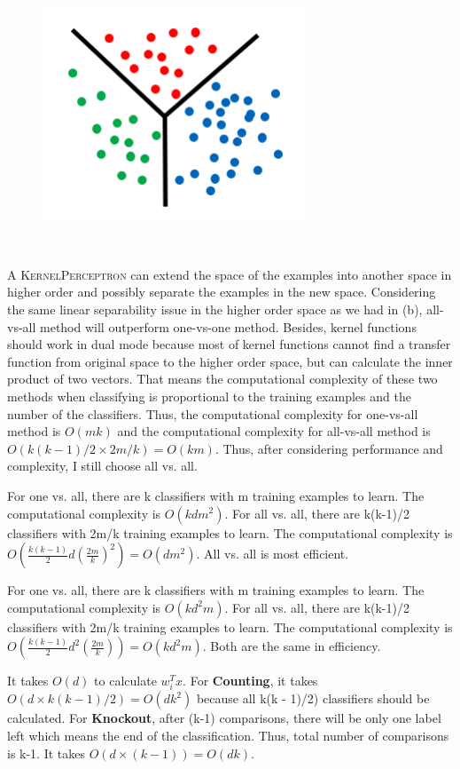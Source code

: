 \begin{figure}[h]
		\centering
	\includegraphics[width=0.7\textwidth]{fig3.png}
\end{figure}\\
\item[(c)]
A \textsc{KernelPerceptron} can extend the space of the examples into another space in higher order and possibly separate the examples in the new space. Considering the same linear separability issue in the higher order space as we had in (b), all-vs-all method will outperform one-vs-one method. Besides, kernel functions should work in dual mode because most of kernel functions cannot find a transfer function from original space to the higher order space, but can calculate the inner product of two vectors. That means the computational complexity of these two methods when classifying is proportional to the training examples and the number of the classifiers. Thus, the computational complexity for one-vs-all method is $O(mk)$ and the computational complexity for all-vs-all method is $O(k(k-1)/2\times 2m/k)=O(km)$. Thus, after considering performance and complexity, I still choose all vs. all.

\item[(d)]
For one vs. all, there are k classifiers with m training examples to learn. The computational complexity is $O(kdm^2)$.
For all vs. all, there are k(k-1)/2 classifiers with 2m/k training examples to learn. The computational complexity is 
$O(\frac{k(k-1)}{2}d(\frac{2m}{k})^2) = O(dm^2)$. All vs. all is most efficient.

\item[(e)]
For one vs. all, there are k classifiers with m training examples to learn. The computational complexity is $O(kd^2m)$.
For all vs. all, there are k(k-1)/2 classifiers with 2m/k training examples to learn. The computational complexity is 
$O(\frac{k(k-1)}{2}d^2(\frac{2m}{k})) = O(kd^2m)$. Both are the same in efficiency.

\item[(f)]
It takes $O(d)$ to calculate $w^T_ix$. For \textbf{Counting}, it takes $O(d\times k(k - 1)/2)= O(dk^2)$ because all k(k - 1)/2) classifiers should be calculated.
For \textbf{Knockout}, after (k-1) comparisons, there will be only one label left which means the end of the classification. Thus, total number of comparisons is k-1. It takes $O(d\times (k-1))=O(dk)$.  






